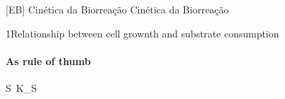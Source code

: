 \documentclass[\mainfilename]{subfiles}
\begin{document}

[EB]
{Cinética da Biorreação} %
{Cinética da Biorreação} %

\setcounter{section}{5}
\begin{sectionBox}1{Relationship between cell grownth and substrate consumption} %
    
    \paragraph*{As rule of thumb}
    \begin{BM}
        S \,K_S
    \end{BM}
    
\end{sectionBox}
\end{document}
